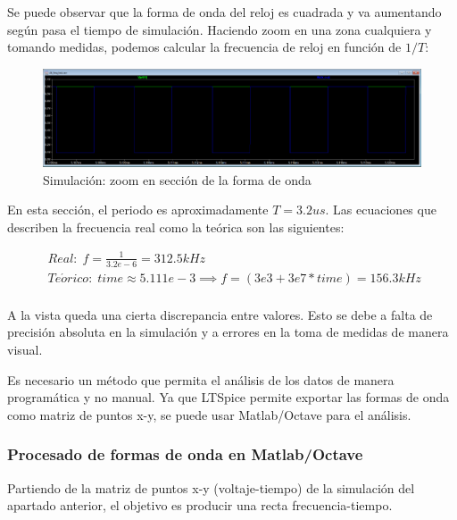 \documentclass[12pt]{report} %
\begin{document}
	Se puede observar que la forma de onda del reloj es cuadrada y va aumentando según pasa el tiempo de simulación. Haciendo zoom en una zona cualquiera y tomando medidas, podemos calcular la frecuencia de reloj en función de $1/T$:

	\begin{figure}[H]
		\includegraphics[width=1\textwidth]{clk-freq-sim-waveform-zoom.PNG}
		\caption[Simulación: zoom en sección de la forma de onda]{Simulación: zoom en sección de la forma de onda}
		\label{fig:clk-freq-sim-waveform-zoom.PNG}
	\end{figure}
	
	En esta sección, el periodo es aproximadamente $T=3.2us$. Las ecuaciones que describen la frecuencia real como la teórica son las siguientes:
	
	\begin{figure}[H]
		\begin{equation} \label{eq:clk-freq_eqs_freq}
		\begin{array}{c}
		Real:\; f = \frac{1}{3.2e-6} = 312.5kHz \\
		Te\acute{o}rico:\; time\approx5.111e-3 \implies f = (3e3 + 3e7 * time) = 156.3kHz \\
		\end{array}
		\end{equation}
	\end{figure}

	A la vista queda una cierta discrepancia entre valores. Esto se debe a falta de precisión absoluta en la simulación y a errores en la toma de medidas de manera visual.
	
	Es necesario un método que permita el análisis de los datos de manera programática y no manual. Ya que LTSpice permite exportar las formas de onda como matriz de puntos x-y, se puede usar Matlab/Octave para el análisis.
	
	\subsubsection{Procesado de formas de onda en Matlab/Octave}
	
	Partiendo de la matriz de puntos x-y (voltaje-tiempo) de la simulación del apartado anterior, el objetivo es producir una recta frecuencia-tiempo.
	
\end{document}
